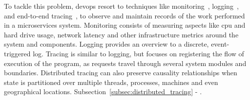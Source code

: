 
To tackle this problem, \gls{devops} resort to techniques like monitoring~\cite{monitoring}, logging~\cite{logging}, and end-to-end tracing~\cite{distributed_tracing}, to observe and maintain records of the work performed in a microservices system. Monitoring consists of measuring aspects like \gls{cpu} and hard drive usage, network latency and other infrastructure metrics around the system and components. Logging provides an overview to a discrete, event-triggered log. Tracing is similar to logging, but focuses on registering the flow of execution of the program, as requests travel through several system modules and boundaries. Distributed tracing can also preserve causality relationships when state is partitioned over multiple threads, processes, machines and even geographical locations. Subsection~\ref{subsec:distributed_tracing} - .

